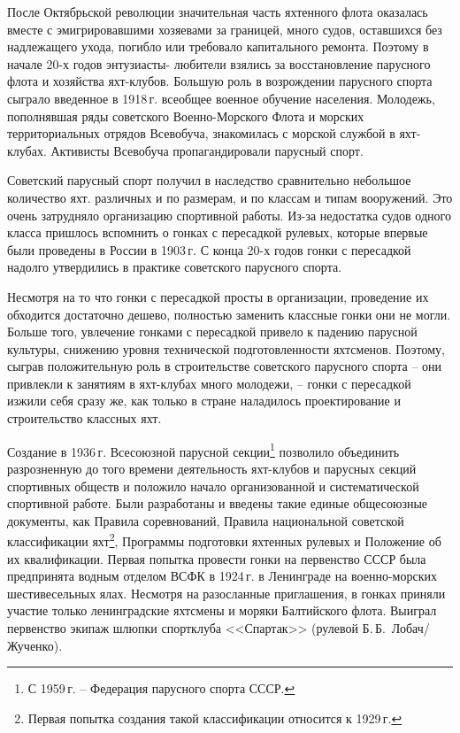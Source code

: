 \documentclass[a4paper, 12pt, twoside, final]{scrbook}
\begin{document}
После Октябрьской революции значительная часть яхтенного флота оказалась
вместе с эмигрировавшими хозяевами за границей, много судов, оставшихся
без надлежащего ухода, погибло или требовало капитального ремонта.
Поэтому в начале 20-х годов энтузиасты- любители взялись за восстановление
парусного флота и хозяйства яхт-клубов. Большую роль в возрождении
парусного спорта сыграло введенное в 1918\,г. всеобщее военное обучение
населения. Молодежь, пополнявшая ряды советского Военно-Морского Флота
и морских территориальных отрядов Всевобуча, знакомилась с морской
службой в яхт-клубах. Активисты Всевобуча пропагандировали парусный
спорт.

Советский парусный спорт получил в наследство сравнительно небольшое
количество яхт. различных и по размерам, и по классам и типам вооружений.
Это очень затрудняло организацию спортивной работы. Из-за недостатка
судов одного класса пришлось вспомнить о гонках с пересадкой рулевых,
которые впервые были проведены в России в 1903\,г. С конца 20-х годов
гонки с пересадкой надолго утвердились в практике советского парусного
спорта.

Несмотря на то что гонки с пересадкой просты в организации, проведение
их обходится достаточно дешево, полностью заменить классные гонки
они не могли. Больше того, увлечение гонками с пересадкой привело
к падению парусной культуры, снижению уровня технической подготовленности
яхтсменов. Поэтому, сыграв положительную роль в строительстве советского
парусного спорта \--- они привлекли к занятиям в яхт-клубах много молодежи,
\--- гонки с пересадкой изжили себя сразу же, как только в стране наладилось
проектирование и строительство классных яхт.

Создание в 1936\,г. Всесоюзной парусной секции\footnote{С 1959\,г. \--- Федерация парусного спорта СССР.}
позволило объединить разрозненную до того времени деятельность яхт-клубов
и парусных секций спортивных обществ и положило начало организованной
и систематической спортивной работе. Были разработаны и введены такие
единые общесоюзные документы, как Правила соревнований, Правила национальной
советской классификации яхт\footnote{Первая попытка создания такой классификации относится к 1929\,г.},
Программы подготовки яхтенных рулевых и Положение об их квалификации.
Первая попытка провести гонки на первенство СССР была предпринята
водным отделом ВСФК в 1924\,г. в Ленинграде на военно-морских шестивесельных
ялах. Несмотря на разосланные приглашения, в гонках приняли участие
только ленинградские яхтсмены и моряки Балтийского флота. Выиграл
первенство экипаж шлюпки спортклуба <<Спартак>> (рулевой Б.\,Б.~Лобач\-/Жученко).
\end{document}
